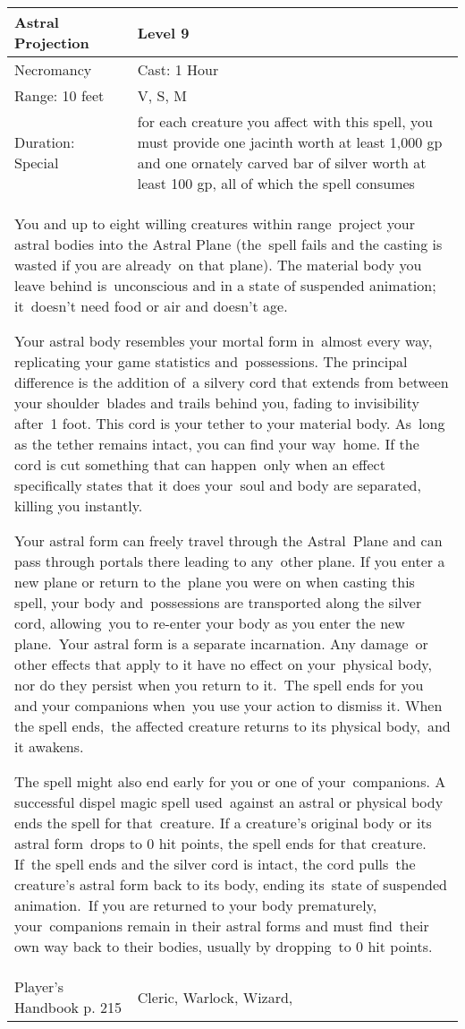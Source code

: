 \documentclass[11pt]{report}
\begin{document}
\begin{table}[H]
	\begin{tabular}{||p{6cm}|p{6cm}||}
		\hline\hline
		\bf{Astral Projection} & Level 9\\ \hline
		Necromancy & Cast: 1 Hour\\ \hline
		Range: 10 feet & V, S, M\\ \hline
		Duration: Special & for each creature you affect with this spell, you must provide one jacinth worth at least 1,000 gp and one ornately carved bar of silver worth at least 100 gp, all of which the spell consumes\\ \hline
		\multicolumn{2}{||p{12cm}||}{You and up to eight willing creatures within range project your astral bodies into the Astral Plane (the spell fails and the casting is wasted if you are already on that plane). 
The material body you leave behind is unconscious and in a state of suspended animation; it doesn’t need food or air and doesn’t age. 

Your astral body resembles your mortal form in almost every way, replicating your game statistics and possessions. The principal difference is the addition of a silvery cord that extends from between your shoulder blades and trails behind you, fading to invisibility after 1 foot. This cord is your tether to your material body. As long as the tether remains intact, you can find your way home. If the cord is cut something that can happen only when an effect specifically states that it does your soul and body are separated, killing you instantly. 

Your astral form can freely travel through the Astral Plane and can pass through portals there leading to any other plane. If you enter a new plane or return to the plane you were on when casting this spell, your body and possessions are transported along the silver cord, allowing you to re-enter your body as you enter the new plane. Your astral form is a separate incarnation. Any damage or other effects that apply to it have no effect on your physical body, nor do they persist when you return to it. The spell ends for you and your companions when you use your action to dismiss it. When the spell ends, the affected creature returns to its physical body, and it awakens. 

The spell might also end early for you or one of your companions. A successful dispel magic spell used against an astral or physical body ends the spell for that creature. If a creature’s original body or its astral form drops to 0 hit points, the spell ends for that creature. If the spell ends and the silver cord is intact, the cord pulls the creature’s astral form back to its body, ending its state of suspended animation. If you are returned to your body prematurely, your companions remain in their astral forms and must find their own way back to their bodies, usually by dropping to 0 hit points.}\\ \hline
Player's Handbook p. 215 & Cleric, Warlock, Wizard, \\ \hline\hline
	\end{tabular}
\end{table}
\end{document}
